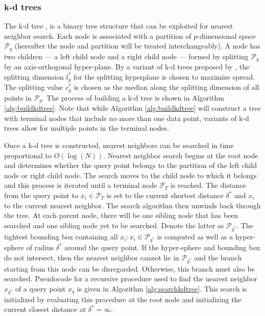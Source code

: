 \documentclass[11pt,a4paper,]{article}
\begin{document}
\hypertarget{k-d-trees}{%
\subsubsection*{k-d trees}\label{k-d-trees}}

The k-d tree \autocite{Bentley1975-zo}, is a binary tree structure that can be exploited for nearest neighbor search. Each node is associated with a partition of \(p\)-dimensional space \(\mathcal{P}_g\) (hereafter the node and partition will be treated interchangeably). A node has two children --- a left child node and a right child node --- formed by splitting \(\mathcal{P}_g\) by an axis-orthogonal hyper-plane. By a variant of k-d trees proposed by \textcite{Friedman1977-dh}, the splitting dimension \(l_g^*\) for the splitting hyperplane is chosen to maximize spread. The splitting value \(c_g^*\) is chosen as the median along the splitting dimension of all points in \(\mathcal{P}_g\). The process of building a k-d tree is shown in Algorithm \ref{alg:buildkdtree}. Note that while Algorithm \ref{alg:buildkdtree} will construct a tree with terminal nodes that include no more than one data point, variants of k-d trees allow for multiple points in the terminal nodes.

Once a k-d tree is constructed, nearest neighbors can be searched in time proportional to \(O(\log(N))\). Nearest neighbor search begins at the root node and determines whether the query point belongs to the partition of the left child node or right child node. The search moves to the child node to which it belongs and this process is iterated until a terminal node \(\mathcal{P}_T\) is reached. The distance from the query point to \(x_i\in\mathcal{P}_T\) is set to the current shortest distance \(\delta^*\) and \(x_i\) to the current nearest neighbor. The search algorithm then unwinds back through the tree. At each parent node, there will be one sibling node that has been searched and one sibling node yet to be searched. Denote the latter as \(\mathcal{P}_{g^*}\). The tightest bounding box containing all \(x_i:x_i\in\mathcal{P}_{g^*}\) is computed as well as a hyper-sphere of radius \(\delta^*\) around the query point. If the hyper-sphere and bounding box do not intersect, then the nearest neighbor cannot lie in \(\mathcal{P}_{g^*}\) and the branch starting from this node can be disregarded. Otherwise, this branch must also be searched. Pseudocode for a recursive procedure used to find the nearest neighbor \(x_{q^*}\) of a query point \(x_q\) is given in Algorithm \ref{alg:searchkdtree}. This search is initialized by evaluating this procedure at the root node and initializing the current closest distance at \(\delta^*=\infty\).
\end{document}
